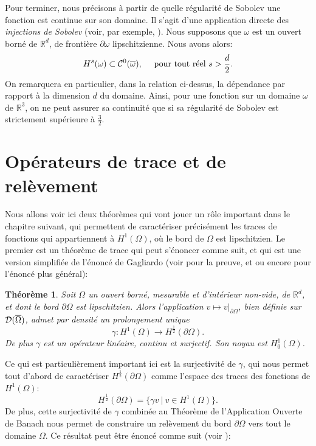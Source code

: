 \documentclass[11pt]{book}
\newtheorem{theorem}{Théorème}[section]
\newcommand{\bt}{\begin{theorem}}
\newcommand{\et}{\end{theorem}}
\newcommand{\caD}{{\cal D}}
\newcommand{\caC}{{\cal C}}
\newcommand{\R}{\mathbb{R}}
\begin{document}
Pour terminer, nous précisons à partir de quelle régularité de Sobolev une fonction est continue sur son domaine. Il s'agit d'une application directe des \emph{injections de Sobolev} (voir, par exemple, \cite[Section 1.4.4]{grisvard-85}). Nous supposons que $\omega$ est un ouvert borné de $\R^d$, de frontière $\partial \omega$ lipschitzienne. Nous avons alors:
\begin{equation} \label{injSobolev}
 H^s (\omega) \subset \caC^0(\overline{\omega}), \quad \mbox{ pour tout réel } s > \frac{d}2.
\end{equation}
On remarquera en particulier, dans la relation ci-dessus, la dépendance par rapport à la dimension $d$ du domaine. Ainsi, pour une fonction sur un domaine $\omega$ de $\R^3$, on ne peut assurer sa continuité que si sa régularité de Sobolev est strictement supérieure à $\frac32$.

\section{Opérateurs de trace et de relèvement}
\label{sect:trace}

Nous allons voir ici deux théorèmes qui vont jouer un rôle important dans le chapitre suivant, qui permettent de caractériser précisément les traces de fonctions qui appartiennent à $H^1(\Omega)$, où le bord de $\Omega$ est lipschitzien. Le premier est un théorème de trace qui peut s'énoncer comme suit, et qui est une version simplifiée de l'énoncé de Gagliardo (voir \cite{gagliardo-57} pour la preuve, et \cite[Theorem 1.5.1.3]{grisvard-85} ou encore \cite[Théorème 1.4.2]{grisvard-86} pour l'énoncé plus général):

\bt
 \label{thm:trace} Soit $\Omega$ un ouvert borné, mesurable et d'intérieur non-vide, de $\R^d$, et dont le bord $\partial \Omega$ est lipschitzien. Alors l'application $v \mapsto v|_{\partial \Omega}$, bien définie sur $\caD(\overline{\Omega})$, admet par densité un prolongement unique
 \[
 \gamma : H^1(\Omega) \rightarrow H^{\frac12} (\partial \Omega).
 \]
De plus $\gamma$ est un opérateur linéaire, continu et surjectif. Son noyau est $H^1_0 (\Omega)$.
\et

Ce qui est particulièrement important ici est la surjectivité de $\gamma$, qui nous permet tout d'abord de caractériser $H^{\frac12} (\partial \Omega)$ comme l'espace des traces des fonctions de $H^1(\Omega)$:
\[
 H^{\frac12} (\partial \Omega) = \{ \gamma v \:|\: v \in H^1(\Omega) \}.
\]
De plus, cette surjectivité de $\gamma$ combinée au Théorème de l'Application Ouverte de Banach nous permet de construire un relèvement du bord $\partial \Omega$ vers tout le domaine $\Omega$. Ce résultat peut être énoncé comme suit (voir \cite[Corollaire B.53]{ern-guermond-04}):
\end{document}
